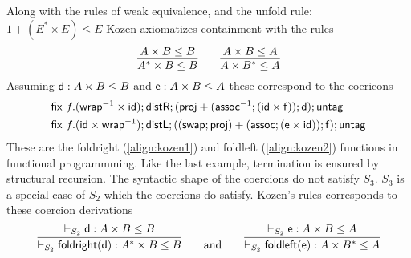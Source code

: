 \begin{example}[Kozen]
Along with the rules of weak equivalence, and the unfold rule: $1 + (E^* \times E) \leq E$ Kozen axiomatizes containment with the rules
\begin{displaymath}
\infer{A^* \times B \leq B}{A \times B \leq B} \qquad \infer{A \times B^* \leq A}{A \times B \leq A}
\end{displaymath}
Assuming $\mathsf{d} : A \times B \leq B $ and $\mathsf{e} : A \times B \leq A $ these correspond to the coericons
\begin{align}
&\mathsf{fix}~f.(\mathsf{wrap}^{-1}\times \mathsf{id}); \mathsf{distR};(\mathsf{proj} + (\mathsf{assoc}^{-1};(\mathsf{id} \times \mathsf{f}));\mathsf{d});\mathsf{untag}\label{align:kozen1}\\
&\mathsf{fix}~f.( \mathsf{id} \times \mathsf{wrap}^{-1}); \mathsf{distL};((\mathsf{swap};\mathsf{proj}) + (\mathsf{assoc};(\mathsf{e} \times \mathsf{id}));\mathsf{f});\mathsf{untag}\label{align:kozen2}
\end{align}
These are the \textsf{foldright} (\ref{align:kozen1}) and \textsf{foldleft} (\ref{align:kozen2}) functions in functional programmming. Like the last example, termination is ensured by structural recursion. The syntactic shape of the coercions do not satisfy $S_3$. $S_3$ is a special case of $S_2$ which the coercions do satisfy. Kozen's rules corresponds to these coercion derivations
\[ \infer{\containsP{}{\mathsf{foldright}(\dslcom{d})}{A^* \times B}{B}{S_2}}{\containsP{}{d}{A \times B}{B}{S_2}} \qquad \text{and} \qquad  \infer{\containsP{}{\mathsf{foldleft}(\dslcom{e})}{A \times B^*}{A}{S_2}}{\containsP{}{e}{A \times B}{A}{S_2}} \]


\end{example}
